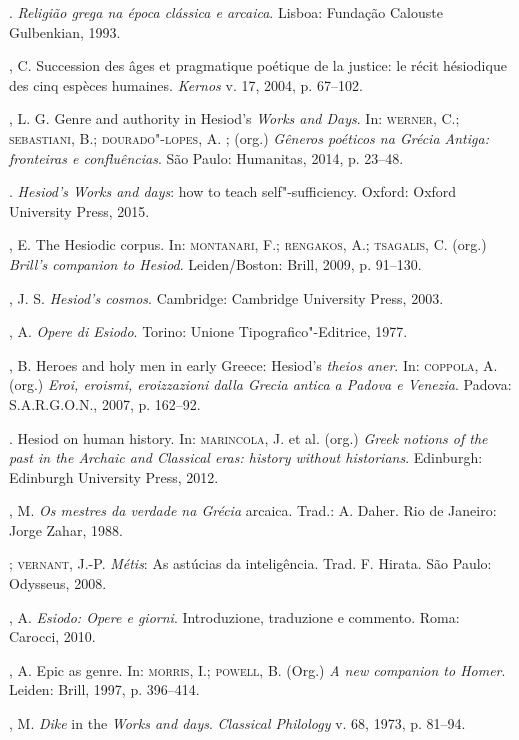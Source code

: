 \begin{bibliohedra}
\titidem. \emph{Religião grega na época clássica e arcaica}. Lisboa: Fundação
Calouste Gulbenkian, 1993.

, C. Succession des âges et pragmatique poétique de la justice: le
récit hésiodique des cinq espèces humaines. \emph{Kernos} v. 17, 2004,
p. 67--102.

, L. G. Genre and authority in Hesiod's \emph{Works and Days}.
In: \textsc{werner}, C.; \textsc{sebastiani}, B.; \textsc{dourado"-lopes}, A. ; (org.) \emph{Gêneros
poéticos na Grécia Antiga: fronteiras e confluências}. São Paulo:
Humanitas, 2014, p. 23--48.

\titidem. \emph{Hesiod's Works and days}: how to teach self"-sufficiency.
Oxford: Oxford University Press, 2015.

, E. The Hesiodic corpus. In: \textsc{montanari}, F.; \textsc{rengakos}, A.;
\textsc{tsagalis}, C. (org.) \emph{Brill's companion to Hesiod}. Leiden/Boston:
Brill, 2009, p. 91--130.

, J. S. \emph{Hesiod's cosmos}. Cambridge: Cambridge University
Press, 2003.

, A. \emph{Opere di Esiodo}. Torino: Unione Tipografico"-Editrice,
1977.

, B. Heroes and holy men in early Greece: Hesiod's \emph{theios
aner}. In: \textsc{coppola}, A. (org.) \emph{Eroi, eroismi, eroizzazioni dalla
Grecia antica a Padova e Venezia}. Padova: S.A.R.G.O.N., 2007, p.
162--92.

\titidem. Hesiod on human history. In: \textsc{marincola}, J. et al. (org.) \emph{Greek
notions of the past in the Archaic and Classical eras: history without
historians}. Edinburgh: Edinburgh University Press, 2012.

, M. \emph{Os mestres da verdade na Grécia} arcaica. Trad.: A.
Daher. Rio de Janeiro: Jorge Zahar, 1988.

\titidem; \textsc{vernant}, J.-P. \emph{Métis}: As astúcias da inteligência.
Trad. F. Hirata. São Paulo: Odysseus, 2008.

, A. \emph{Esiodo: Opere e giorni}. Introduzione, traduzione e
commento. Roma: Carocci, 2010.

, A. Epic as genre. In: \textsc{morris}, I.; \textsc{powell}, B. (Org.) \emph{A new
companion to Homer}. Leiden: Brill, 1997, p. 396--414.

, M. \emph{Dike} in the \emph{Works and days}. \emph{Classical
Philology} v. 68, 1973, p. 81--94.


\end{bibliohedra}
